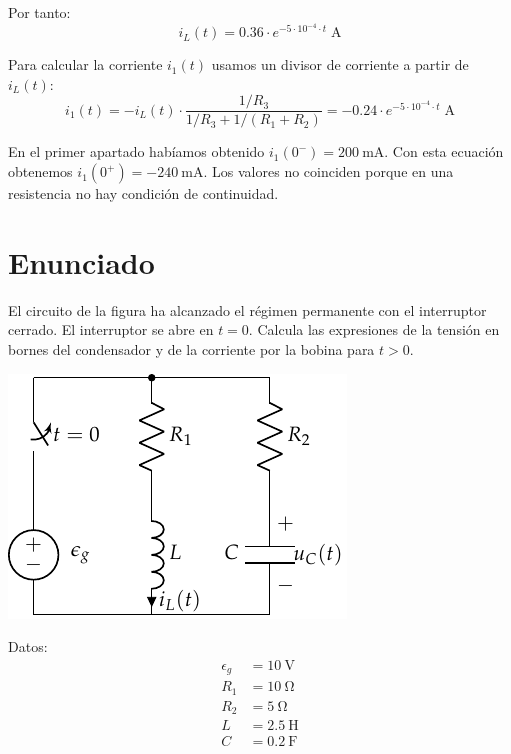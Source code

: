 Por tanto:
\begin{equation*}
  i_L(t) = 0.36 \cdot e^{-5 \cdot 10^{-4} \cdot t}\;\si{\ampere}
\end{equation*}

\vspace{2mm}
Para calcular la corriente $i_1(t)$ usamos un divisor de corriente a
partir de $i_L(t)$:
\begin{equation*}
  i_1(t) = -i_L(t) \cdot \frac{1/R_3}{1/R_3 + 1/(R_1 + R_2)} = -0.24 \cdot e^{-5 \cdot 10^{-4} \cdot t}\;\si{\ampere}
\end{equation*}

\vspace{3mm}
En el primer apartado habíamos obtenido
$i_1(0^-) = \SI{200}{\milli\ampere}$. Con esta ecuación obtenemos
$i_1(0^+) = -\SI{240}{\milli\ampere}$. Los valores no coinciden porque
en una resistencia no hay condición de continuidad.

\section{Enunciado}

El circuito de la figura ha alcanzado el régimen permanente con el
interruptor cerrado. El interruptor se abre en $t = 0$. Calcula las
expresiones de la tensión en bornes del condensador y de la corriente
por la bobina para $t > 0$.

\vspace{4mm}

\begin{minipage}{0.6\textwidth}
  \includegraphics[scale=1]{figuras/FM_4_8}
\end{minipage}
\hfill
\begin{minipage}{0.4\textwidth}
  Datos:
  \begin{align*}
    \epsilon_g &= \SI{10}{\volt}\\
    R_1 &= \SI{10}{\ohm}\\
    R_2 &= \SI{5}{\ohm}\\
    L &= \SI{2.5}{\henry}\\
    C &= \SI{0.2}{\farad}      
  \end{align*}
\end{minipage}

